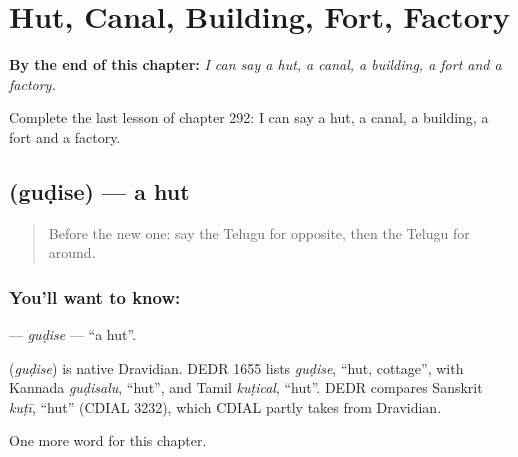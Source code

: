 
\chapter{Hut, Canal, Building, Fort, Factory}
\label{ch:te-hut-canal-building-fort-factory}

\begin{chapteropening}
\textbf{By the end of this chapter:} \emph{I can say a hut, a canal, a building, a fort and a factory.}

Complete the last lesson of chapter 292: I can say a hut, a canal, a building, a fort and a factory.
\end{chapteropening}

\section[\texorpdfstring{\te{గుడిసె} (guḍise)}{గుడిసె (guḍise)}]{ (guḍise) — a hut}

\label{lesson:TE-C292-gudise}



\begin{quote}
Before the new one: say the Telugu for opposite, then the Telugu for around.
\end{quote}

\subsection*{You'll want to know: }
\textbf{} — \emph{guḍise} — \textquotedblleft{}a hut\textquotedblright{}.

\begin{cousinweb}
\textbf{} (\emph{guḍise}) is native Dravidian. DEDR 1655 lists \emph{guḍise}, \textquotedblleft{}hut, cottage\textquotedblright{}, with Kannada \emph{guḍisalu}, \textquotedblleft{}hut\textquotedblright{}, and Tamil \emph{kuṭical}, \textquotedblleft{}hut\textquotedblright{}. DEDR compares Sanskrit \emph{kuṭī}, \textquotedblleft{}hut\textquotedblright{} (CDIAL 3232), which CDIAL partly takes from Dravidian.
\end{cousinweb}

\begin{grammarlens}[title={What you've built}]
One more word for this chapter.
\end{grammarlens}

